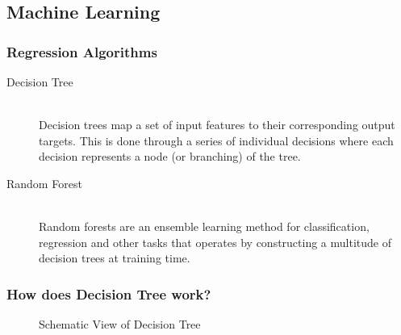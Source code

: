 \documentclass{beamer}
\begin{document}
\subsection{Machine Learning}
\begin{frame}
	\frametitle{Regression Algorithms}
    \begin{description}
        \item[Decision Tree] \hfill \\ Decision trees map a set of input features to their corresponding output targets. This is done through a series of individual decisions where each decision represents a node (or branching) of the tree.
        \\[0.2in]
        \pause
        \item[Random Forest] \hfill \\ Random forests are an ensemble learning method for classification, regression and other tasks that operates by constructing a multitude of decision trees at training time.
    \end{description}
    \end{frame}
\begin{frame}
	\frametitle{How does Decision Tree work?}
    \begin{figure}
        \caption*{Schematic View of Decision Tree}
    \end{figure}
    \end{frame}
\end{document}
